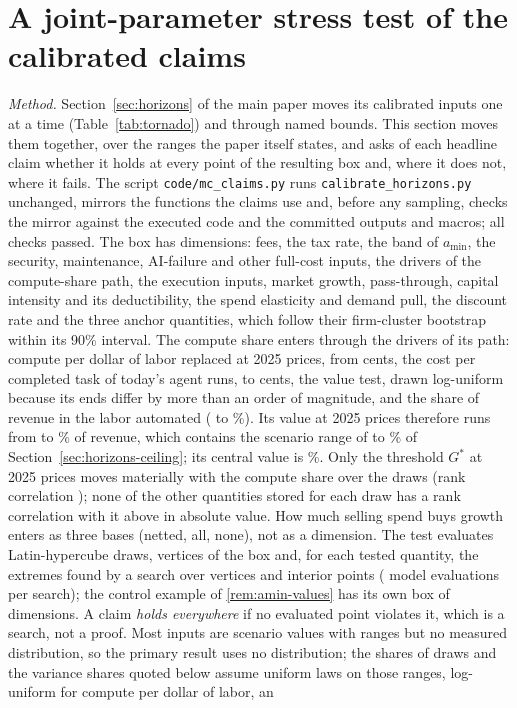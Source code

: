 \clearpage
\section{A joint-parameter stress test of the calibrated claims}\label{supp:stress}
\emph{Method.} Section~\ref{sec:horizons} of the main paper moves its calibrated inputs one at a time (Table~\ref{tab:tornado}) and through named bounds. This section moves them together, over the ranges the paper itself states, and asks of each headline claim whether it holds at every point of the resulting box and, where it does not, where it fails. The script \texttt{code/mc\_claims.py} runs \texttt{calibrate\_horizons.py} unchanged, mirrors the functions the claims use and, before any sampling, checks the mirror against the executed code and the committed outputs and macros; all \StReproChecks{} checks passed. The box has \StDims{} dimensions: fees, the tax rate, the band of $a_{\min}$, the security, maintenance, AI-failure and other full-cost inputs, the drivers of the compute-share path, the execution inputs, market growth, pass-through, capital intensity and its deductibility, the spend elasticity and demand pull, the discount rate and the three anchor quantities, which follow their firm-cluster bootstrap within its 90\% interval. The compute share enters through the drivers of its path: compute per dollar of labor replaced at 2025 prices, from \StKappaLo{} cents, the cost per completed task of today's agent runs, to \StKappaHi{} cents, the value test, drawn log-uniform because its ends differ by more than an order of magnitude, and the share of revenue in the labor automated (\StSLLo{} to \StSLHi\%). Its value at 2025 prices therefore runs from \StCcBoxMin{} to \StCcBoxMax\% of revenue, which contains the scenario range of \CcLo{} to \CcHi\% of Section~\ref{sec:horizons-ceiling}; its central value is \CcCen\%. Only the threshold $G^*$ at 2025 prices moves materially with the compute share over the draws (rank correlation \StGstarCcRho); none of the other quantities stored for each draw has a rank correlation with it above \StOtherCcRho{} in absolute value. How much selling spend buys growth enters as three bases (netted, all, none), not as a dimension. The test evaluates \StDraws{} Latin-hypercube draws, \StCorners{} vertices of the box and, for each tested quantity, the extremes found by a search over vertices and interior points (\StSearchBudget{} model evaluations per search); the control example of \autoref{rem:amin-values} has its own box of \StAminDims{} dimensions. A claim \emph{holds everywhere} if no evaluated point violates it, which is a search, not a proof. Most inputs are scenario values with ranges but no measured distribution, so the primary result uses no distribution; the shares of draws and the variance shares quoted below assume uniform laws on those ranges, log-uniform for compute per dollar of labor, an 